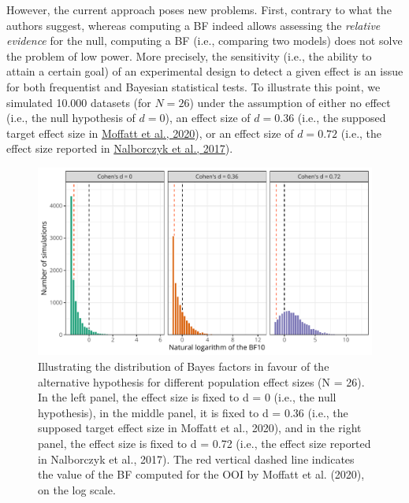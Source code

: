 \documentclass[
  english,
  man, donotrepeattitle,mask,floatsintext]{apa6}
\begin{document}
However, the current approach poses new problems. First, contrary to what the authors suggest, whereas computing a BF indeed allows assessing the \emph{relative evidence} for the null, computing a BF (i.e., comparing two models) does not solve the problem of low power. More precisely, the sensitivity (i.e., the ability to attain a certain goal) of an experimental design to detect a given effect is an issue for both frequentist and Bayesian statistical tests. To illustrate this point, we simulated 10.000 datasets (for \(N = 26\)) under the assumption of either no effect (i.e., the null hypothesis of \(d = 0\)), an effect size of \(d = 0.36\) (i.e., the supposed target effect size in \protect\hyperlink{ref-moffatt_inner_2020}{Moffatt et al., 2020}), or an effect size of \(d = 0.72\) (i.e., the effect size reported in \protect\hyperlink{ref-nalborczyk_orofacial_2017}{Nalborczyk et al., 2017}).

\begin{figure}[!htb]

{\centering \includegraphics[width=1\linewidth]{manuscript_files/figure-latex/bf-dance-1} 

}

\caption{Illustrating the distribution of Bayes factors in favour of the alternative hypothesis for different population effect sizes (N = 26). In the left panel, the effect size is fixed to d = 0 (i.e., the null hypothesis), in the middle panel, it is fixed to d = 0.36 (i.e., the supposed target effect size in Moffatt et al., 2020), and in the right panel, the effect size is fixed to d = 0.72 (i.e., the effect size reported in Nalborczyk et al., 2017). The red vertical dashed line indicates the value of the BF computed for the OOI by Moffatt et al. (2020), on the log scale.}\label{fig:bf-dance}
\end{figure}
\end{document}
